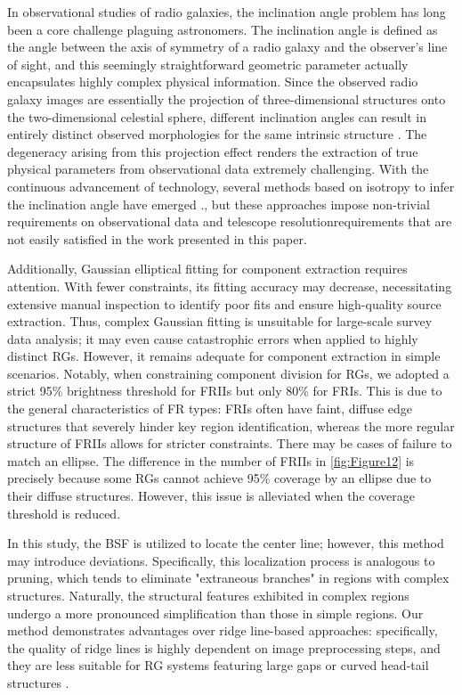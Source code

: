 \documentclass{aa}
\begin{document}
In observational studies of radio galaxies, the inclination angle problem has long been a core challenge plaguing astronomers. The inclination angle is defined as the angle between the axis of symmetry of a radio galaxy and the observer’s line of sight, and this seemingly straightforward geometric parameter actually encapsulates highly complex physical information. Since the observed radio galaxy images are essentially the projection of three-dimensional structures onto the two-dimensional celestial sphere, different inclination angles can result in entirely distinct observed morphologies for the same intrinsic structure \citep{reynolds_projection_1980}. The degeneracy arising from this projection effect renders the extraction of true physical parameters from observational data extremely challenging. With the continuous advancement of technology, several methods based on isotropy to infer the inclination angle have emerged \citep[e.g.,][]{schmitt_jet_2001,drouart_jet_2012,oei_discovery_2022}., but these approaches impose non-trivial requirements on observational data and telescope resolution\textemdash requirements that are not easily satisfied in the work presented in this paper.

Additionally, Gaussian elliptical fitting for component extraction requires attention. With fewer constraints, its fitting accuracy may decrease, necessitating extensive manual inspection to identify poor fits and ensure high-quality source extraction. Thus, complex Gaussian fitting is unsuitable for large-scale survey data analysis; it may even cause catastrophic errors when applied to highly distinct RGs. However, it remains adequate for component extraction in simple scenarios. Notably, when constraining component division for RGs, we adopted a strict 95\% brightness threshold for FRIIs but only 80\% for FRIs. This is due to the general characteristics of FR types: FRIs often have faint, diffuse edge structures that severely hinder key region identification, whereas the more regular structure of FRIIs allows for stricter constraints. There may be cases of failure to match an ellipse. The difference in the number of FRIIs in \autoref{fig:Figure12} is precisely because some RGs cannot achieve 95\% coverage by an ellipse due to their diffuse structures. However, this issue is alleviated when the coverage threshold is reduced.


In this study, the BSF is utilized to locate the center line; however, this method may introduce deviations. Specifically, this localization process is analogous to pruning, which tends to eliminate "extraneous branches" in regions with complex structures. Naturally, the structural features exhibited in complex regions undergo a more pronounced simplification than those in simple regions. Our method demonstrates advantages over ridge line-based approaches: specifically, the quality of ridge lines is highly dependent on image preprocessing steps, and they are less suitable for RG systems featuring large gaps or curved head-tail structures \citep[e.g.,][]{barkus_application_2021,clews_radio-loud_2025}.
\end{document}
